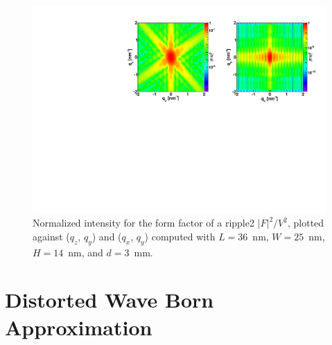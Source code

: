 \begin{figure}[h]
\begin{center}
\includegraphics[width=\textwidth]{Figures/figffripple2}
\end{center}
\caption{Normalized intensity for the form factor of a ripple2
  $|F|^2/V^2$, plotted against ($q_z$, $q_y$) and  ($q_x$, $q_y$)
  computed with $L=36$~nm, $W=25$~nm, $H=14$~nm, and $d=3$~mm.}
\label{fig:FFripple2Ex}
\end{figure}

\FloatBarrier


\newpage{\cleardoublepage}
\section{Distorted Wave Born Approximation}


\newpage{\cleardoublepage}
